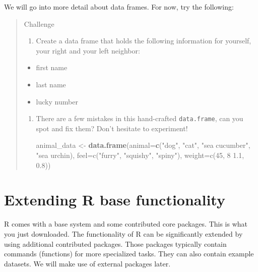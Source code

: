 \documentclass[]{book}
\newenvironment{Shaded}{\begin{snugshade}}{\end{snugshade}}
\newcommand{\KeywordTok}[1]{\textcolor[rgb]{0.13,0.29,0.53}{\textbf{#1}}}
\newcommand{\DataTypeTok}[1]{\textcolor[rgb]{0.13,0.29,0.53}{#1}}
\newcommand{\StringTok}[1]{\textcolor[rgb]{0.31,0.60,0.02}{#1}}
\newcommand{\NormalTok}[1]{#1}
\providecommand{\tightlist}{%
  \setlength{\itemsep}{0pt}\setlength{\parskip}{0pt}}
\theoremstyle{definition}
\theoremstyle{definition}
\theoremstyle{remark}
\begin{document}
We will go into more detail about data frames. For now, try the
following:

\begin{quote}
Challenge

\begin{enumerate}
\def\labelenumi{\arabic{enumi}.}
\tightlist
\item
  Create a data frame that holds the following information for yourself,
  your right and your left neighbor:
\end{enumerate}

\begin{itemize}
\tightlist
\item
  first name
\item
  last name
\item
  lucky number
\end{itemize}

\begin{enumerate}
\def\labelenumi{\arabic{enumi}.}
\setcounter{enumi}{1}
\item
  There are a few mistakes in this hand-crafted \texttt{data.frame}, can
  you spot and fix them? Don't hesitate to experiment!

\begin{Shaded}
\begin{Highlighting}[]
\NormalTok{animal_data <-}\StringTok{ }\KeywordTok{data.frame}\NormalTok{(}\DataTypeTok{animal=}\KeywordTok{c}\NormalTok{(}\StringTok{"dog"}\NormalTok{, }\StringTok{"cat"}\NormalTok{, }\StringTok{"sea cucumber"}\NormalTok{, }\StringTok{"sea urchin),}
\StringTok{                          feel=c("}\NormalTok{furry}\StringTok{", "}\NormalTok{squishy}\StringTok{", "}\NormalTok{spiny}\StringTok{"),}
\StringTok{                          weight=c(45, 8 1.1, 0.8))}
\end{Highlighting}
\end{Shaded}
\end{enumerate}
\end{quote}

\section{Extending R base
functionality}\label{extending-r-base-functionality}

R comes with a base system and some contributed core packages. This is
what you just downloaded. The functionality of R can be significantly
extended by using additional contributed packages. Those packages
typically contain commands (functions) for more specialized tasks. They
can also contain example datasets. We will make use of external packages
later.
\end{document}
